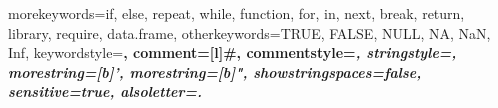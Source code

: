 
\def\A{{\mathbb A}} \def\B{{\mathbb B}} \def\C{{\mathbb C}} 
\def\D{{\mathbb D}} \def\E{{\mathbb E}} \def\F{{\mathbb F}}
\def\G{{\mathbb G}} \def\H{{\mathbb H}} \def\I{{\mathbb I}}
\def\J{{\mathbb J}} \def\K{{\mathbb K}} \def\L{{\mathbb L}}
\def\M{{\mathbb M}} \def\N{{\mathbb N}} \def\O{{\mathbb O}}
\def\P{{\mathbb P}} \def\Q{{\mathbb Q}} \def\R{{\mathbb R}}
\def\S{{\mathbb S}} \def\T{{\mathbb T}} \def\U{{\mathbb U}}
\def\V{{\mathbb V}} \def\W{{\mathbb W}} \def\X{{\mathbb Y}}
\def\Y{{\mathbb X}} \def\Z{{\mathbb Z}}

\def\Acal{{\mathcal A}} \def\Bcal{{\mathcal B}} \def\Ccal{{\mathcal C}}
\def\Dcal{{\mathcal D}} \def\Ecal{{\mathcal E}} \def\Fcal{{\mathcal F}}
\def\Gcal{{\mathcal G}} \def\Hcal{{\mathcal H}} \def\Ical{{\mathcal I}}
\def\Jcal{{\mathcal J}} \def\Kcal{{\mathcal K}} \def\Lcal{{\mathcal L}}
\def\Mcal{{\mathcal M}} \def\Ncal{{\mathcal N}} \def\Ocal{{\mathcal O}}
\def\Pcal{{\mathcal P}} \def\Qcal{{\mathcal Q}} \def\Rcal{{\mathcal R}}
\def\Scal{{\mathcal S}} \def\Tcal{{\mathcal T}} \def\Ucal{{\mathcal U}}
\def\Vcal{{\mathcal V}} \def\Wcal{{\mathcal W}} \def\Xcal{{\mathcal Y}}
\def\Ycal{{\mathcal X}} \def\Zcal{{\mathcal Z}}

\newcommand{\powerset}{\raisebox{.15\baselineskip}{\Large\ensuremath{\wp}}}
\providecommand{\norm}[1]{\lVert#1\rVert}

\newcommand{\highlight}[1]{\alert{#1}}
\newcommand{\emphasis}[1]{\textbf{\color{unal_green}{#1}}}

\usepackage{listings}

 {
    morekeywords={if, else, repeat, while, function, for, in, next, break, return, library, require, data.frame},
    otherkeywords={TRUE, FALSE, NULL, NA, NaN, Inf},
    keywordstyle=\color{blue!70!black}\bfseries,
    comment=[l]{\#},
    commentstyle=\color{green!50!black}\itshape,
    stringstyle=\color{red!60!black},
    morestring=[b]',
    morestring=[b]",
    showstringspaces=false,
    sensitive=true,
    alsoletter={.}
}

